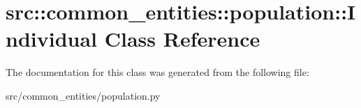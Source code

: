 \hypertarget{classsrc_1_1common__entities_1_1population_1_1Individual}{
\section{src::common\_\-entities::population::Individual Class Reference}
\label{classsrc_1_1common__entities_1_1population_1_1Individual}
}


The documentation for this class was generated from the following file:\begin{DoxyCompactItemize}
\item 
src/common\_\-entities/population.py\end{DoxyCompactItemize}

